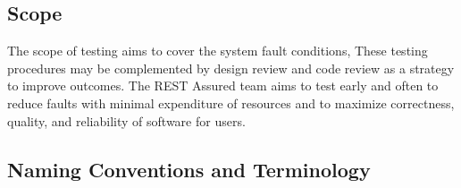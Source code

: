 \subsection{Scope}
The scope of testing aims to cover the system fault conditions, These testing procedures may be complemented by design review and code review as a strategy to improve outcomes. The REST Assured team aims to test early and often to reduce faults with minimal expenditure of resources and to maximize correctness, quality, and reliability of software for users.

\subsection{Naming Conventions and Terminology}

%
%

